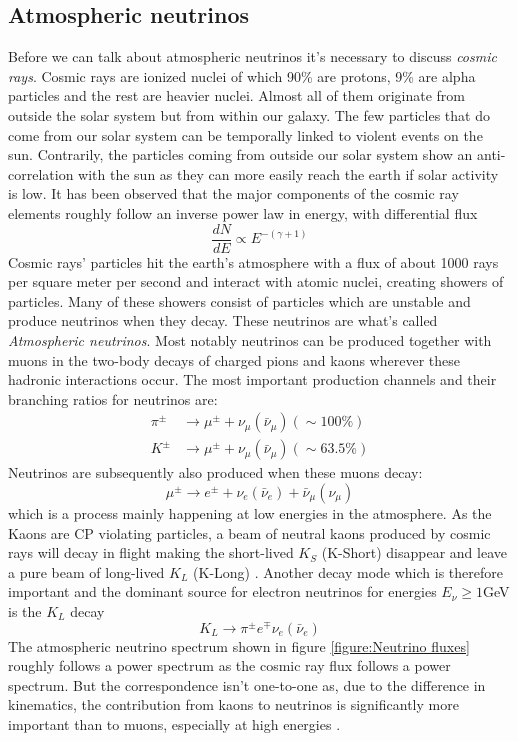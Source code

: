\subsection{Atmospheric neutrinos}
\label{sec:AtmosphericNeutrinos}
Before we can talk about atmospheric neutrinos it's necessary to discuss \textit{cosmic rays}.
Cosmic rays are ionized nuclei of which 90\% are protons, 9\% are alpha particles and
the rest are heavier nuclei. Almost all of them originate from outside the solar system but
from within our galaxy. The few particles that do come from our solar system can be temporally
linked to violent events on the sun. Contrarily, the particles coming from outside
our solar system show an anti-correlation with the sun as they can more easily reach the earth
if solar activity is low.
It has been observed that the major components of the cosmic ray elements
roughly follow an inverse power law in energy, with differential flux \cite{gaisser_engel_resconi_2016}
\begin{equation}
	\frac{dN}{dE} \propto E^{-(\gamma+1)}
\end{equation}
Cosmic rays' particles hit the earth's atmosphere with a flux of about 1000 rays per
square meter per second and interact with atomic nuclei, creating showers of particles. 
Many of these showers consist of
particles which are unstable and produce neutrinos when they decay. These
neutrinos are what's called \textit{Atmospheric neutrinos}.  Most notably
neutrinos can be produced together with muons in the two-body decays of charged
pions and kaons wherever these hadronic interactions occur.  The most important
production channels and their branching ratios for neutrinos are:
\begin{align}
	\pi^\pm &\rightarrow \mu^\pm + \nu_\mu(\bar{\nu}_\mu) (\sim 100\%)\\
	K^\pm &\rightarrow \mu^\pm + \nu_\mu(\bar{\nu}_\mu) (\sim 63.5\%)
\end{align}
Neutrinos are subsequently also produced when these muons decay:
\begin{equation}
	\mu^\pm \rightarrow e^\pm + \nu_e(\bar{\nu}_e) + \bar{\nu}_\mu(\nu_\mu)
\end{equation}
which is a process mainly happening at low energies in the atmosphere.  As the
Kaons are CP violating particles, a beam of neutral kaons produced by cosmic
rays will decay in flight making the short-lived $K_S$ (K-Short) disappear and leave a
pure beam of long-lived $K_L$ (K-Long) \cite{griffiths2008introduction}.  Another decay
mode which is therefore important and the dominant source for electron neutrinos for
energies $E_\nu \geq 1$GeV is the $K_L$  decay
\begin{equation}
	K_L \rightarrow \pi^{\pm}e^\mp\nu_e(\bar{\nu}_e)
\end{equation}
The atmospheric neutrino spectrum shown in figure \ref{figure:Neutrino
fluxes} roughly follows a power spectrum as the cosmic ray flux follows a power
spectrum. But the correspondence isn't one-to-one as, due to the difference in
kinematics, the contribution from kaons to neutrinos is significantly more
important than to muons, especially at high energies \cite{gaisser_engel_resconi_2016}.

